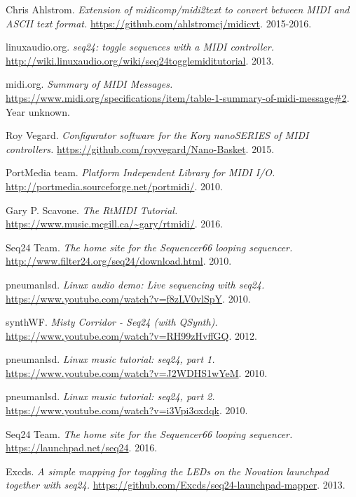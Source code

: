 \begin{thebibliography}{99}
   Chris Ahlstrom.
   \emph{Extension of midicomp/midi2text to convert between MIDI and ASCII
      text format.}
   \url{https://github.com/ahlstromcj/midicvt}.
   2015-2016.

   linuxaudio.org.
   \emph{seq24: toggle sequences with a MIDI controller.}
   \url{http://wiki.linuxaudio.org/wiki/seq24togglemiditutorial}.
   2013.

   midi.org.
   \emph{Summary of MIDI Messages.}
   \url{https://www.midi.org/specifications/item/table-1-summary-of-midi-message#2}.
   Year unknown.

   Roy Vegard.
   \emph{Configurator software for the Korg nanoSERIES of MIDI controllers.}
   \url{https://github.com/royvegard/Nano-Basket}.
   2015.

   PortMedia team.
   \emph{Platform Independent Library for MIDI I/O.}
   \url{http://portmedia.sourceforge.net/portmidi/}.
   2010.

   Gary P. Scavone.
   \emph{The RtMIDI Tutorial.}
   \url{https://www.music.mcgill.ca/~gary/rtmidi/}.
   2016.

   Seq24 Team.
   \emph{The home site for the Sequencer66 looping sequencer.}
   \url{http://www.filter24.org/seq24/download.html}.
   2010.

   pneumanlsd.
   \emph{Linux audio demo: Live sequencing with seq24.}
   \url{https://www.youtube.com/watch?v=f8zLV0vlSpY}.
   2010.

   synthWF.
   \emph{Misty Corridor - Seq24 (with QSynth).}
   \url{https://www.youtube.com/watch?v=RH99zHvffGQ}.
   2012.

   pneumanlsd.
   \emph{Linux music tutorial: seq24, part 1.}
   \url{https://www.youtube.com/watch?v=J2WDHS1wYeM}.
   2010.
   
   pneumanlsd.
   \emph{Linux music tutorial: seq24, part 2.}
   \url{https://www.youtube.com/watch?v=i3Vpi3oxdqk}.
   2010.

   Seq24 Team.
   \emph{The home site for the Sequencer66 looping sequencer.}
   \url{https://launchpad.net/seq24}.
   2016.

   Excds.
   \emph{A simple mapping for toggling the LEDs on the Novation launchpad
   together with seq24.}
   \url{https://github.com/Excds/seq24-launchpad-mapper}.
   2013.


\end{thebibliography}
